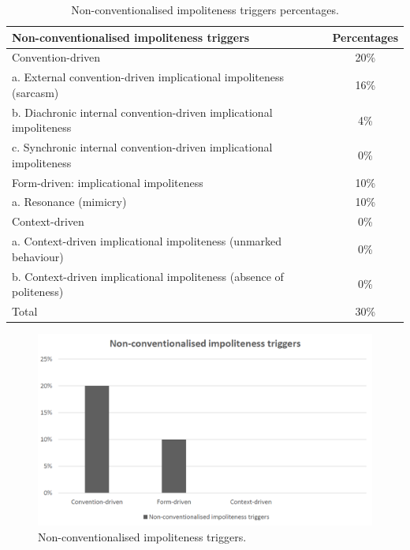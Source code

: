 \documentclass[english]{textolivre}
\begin{document}
\begin{table}[h!]
\centering
\begin{threeparttable}
\caption{Non-conventionalised impoliteness triggers percentages.}\label{tab-2}
\begin{tabular}{lc}
\toprule
Non-conventionalised impoliteness triggers & Percentages \\
\midrule
Convention-driven & 20\% \\
\quad a. External convention-driven implicational impoliteness (sarcasm) & 16\% \\
\quad b. Diachronic internal convention-driven implicational impoliteness & 4\% \\
\quad c. Synchronic internal convention-driven implicational impoliteness & 0\% \\
Form-driven: implicational impoliteness & 10\% \\
\quad a. Resonance (mimicry) & 10\% \\
Context-driven & 0\% \\
\quad a. Context-driven implicational impoliteness (unmarked behaviour) & 0\% \\
\quad b. Context-driven implicational impoliteness (absence of politeness) & 0\% \\
[0.5em]
Total & 30\% \\
\bottomrule
\end{tabular}
\end{threeparttable}
\end{table}

\begin{figure}[h!]
    \centering
    \begin{minipage}{0.85\linewidth}
    \includegraphics[width=\linewidth]{imagens/figura2.png}
    \caption{Non-conventionalised impoliteness triggers.}\label{fig-2}
    \end{minipage}
\end{figure}
\end{document}
